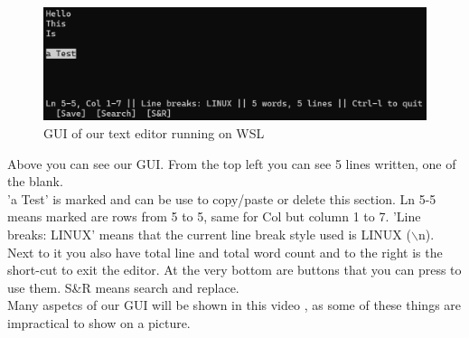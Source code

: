 \begin{figure}[h]
    \centering
    \includegraphics[width=1.0\linewidth]{figures/results_terminal.png}
    \caption{GUI of our text editor running on WSL}
    \label{fig:GUIterminal}            
\end{figure}
\noindent
Above you can see our GUI. From the top left you can see 5 lines written, one of the blank.
\\'a Test' is marked and can be use to copy/paste or delete this section.
Ln 5-5 means marked are rows from 5 to 5, same for Col but column 1 to 7.
'Line breaks: LINUX' means that the current line break style used is LINUX ($\backslash$n).
\\Next to it you also have total line and total word count and to the right is the short-cut to exit the editor.
At the very bottom are buttons that you can press to use them. S\&R means search and replace.
\\Many aspetcs of our GUI will be shown in this video \cite{demo}, as some of these things are impractical to show on a picture.